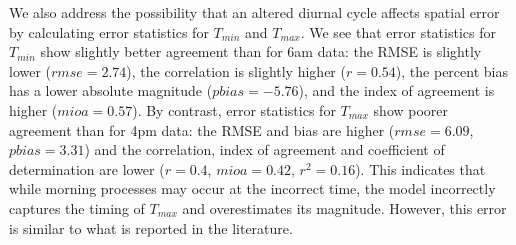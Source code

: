 \documentclass[draft,linenumbers]{agujournal}
\begin{document}
We also address the possibility that an altered diurnal cycle affects spatial error by calculating error statistics for $T_{min}$ and $T_{max}$. We see that error statistics for $T_{min}$ show slightly better agreement than for 6am data: the RMSE is slightly lower ($rmse = 2.74$), the correlation is slightly higher ($r=0.54$), the percent bias has a lower absolute magnitude ($pbias=-5.76$), and the index of agreement is higher ($mioa=0.57$). By contrast, error statistics for $T_{max}$ show poorer agreement than for 4pm data: 
the RMSE and bias are higher ($rmse=6.09$, $pbias=3.31$) and the correlation, index of agreement and coefficient of determination are lower ($r=0.4$, $mioa=0.42$, $r^2=0.16$). 
This indicates that while morning processes may occur at the incorrect time, the model incorrectly captures the timing of $T_{max}$ and overestimates its magnitude. However, this error is similar to what is reported in the literature. 

%
\end{document}

